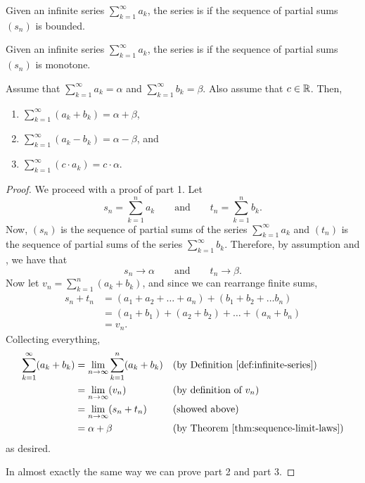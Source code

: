 \begin{definition}
  Given an infinite series $\sum_{k = 1}^{\infty} a_k$, the series
  is  if the sequence of partial sums $(s_n)$ is bounded.
\end{definition}

\begin{definition}
  Given an infinite series $\sum_{k = 1}^{\infty} a_k$, the series is
   if the sequence of partial sums $(s_n)$ is monotone.
\end{definition}

\begin{theorem}
  Assume that $\sum_{k = 1}^{\infty} a_k = \alpha$ and $\sum_{k =
  1}^{\infty} b_k = \beta$.
  Also assume that $c \in \mathbb R$. Then,
  \begin{enumerate}
    \item $\sum_{k = 1}^{\infty} (a_k + b_k) = \alpha + \beta$,
    \item $\sum_{k = 1}^{\infty} (a_k - b_k) = \alpha - \beta$, and
    \item $\sum_{k = 1}^{\infty} (c \cdot a_k) = c \cdot \alpha$.
  \end{enumerate}
\end{theorem}

\begin{proof}
  We proceed with a proof of part 1. Let
  \[ s_n = \sum_{k = 1}^{n} a_k \qquad \text{and} \qquad t_n =
  \sum_{k = 1}^{n} b_k. \]
  Now, $(s_n)$ is the sequence of partial sums of the series $\sum_{k
  = 1}^{\infty} a_k$ and $(t_n)$ is the sequence of partial sums of
  the series $\sum_{k = 1}^{\infty} b_k$. Therefore, by assumption
  and , we have that
  \[ s_n \to \alpha \qquad \text{and} \qquad t_n \to \beta. \]
  Now let $v_n = \sum_{k = 1}^{n} (a_k + b_k)$, and since we can
  rearrange finite sums,
  \begin{align*}
    s_n + t_n & = (a_1 + a_2 + \dots + a_n) + (b_1 + b_2 + \dots b_n) \\
    & = (a_1 + b_1) + (a_2 + b_2) + \dots + (a_n + b_n) \\
    & = v_n.
  \end{align*}
  Collecting everything,
  \begin{align*}
    \sum_{k = 1}^{\infty} (a_k + b_k) & = \lim_{n \to \infty} \sum_{k = 1}^{n}
    (a_k + b_k) && \text{(by \defref{infinite-series})} \\
    & = \lim_{n \to \infty} (v_n) && \text{(by definition of $v_n$)} \\
    & = \lim_{n \to \infty} (s_n + t_n) && \text{(showed above)} \\
    & = \alpha + \beta && \text{(by \thmref{sequence-limit-laws})}
  \end{align*}
  as desired.

  In almost exactly the same way we can prove part 2 and part 3.
\end{proof}

